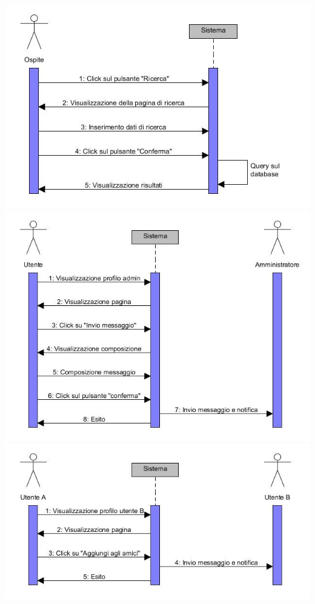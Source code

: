 \documentclass[a4paper,12pt]{article}
\begin{document}
\begin{flushleft}
\includegraphics[scale=0.8]{sDiagrams/ricercaUtenti.jpg} \\[2\baselineskip]
\includegraphics[scale=0.8]{sDiagrams/invioMessaggio.jpg} \\[2\baselineskip]
\includegraphics[scale=0.8]{sDiagrams/richiestaAmicizia.jpg} \\[2\baselineskip]

\end{flushleft}
\end{document}
